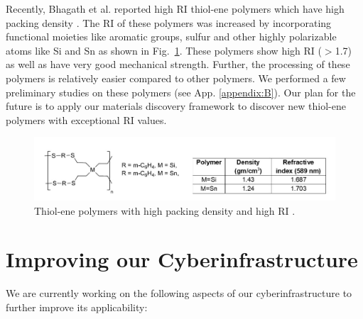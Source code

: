 Recently, Bhagath et al. reported high RI thiol-ene polymers which have high packing density \citep{Bhagat2012,Bhagat2015,Bhagat2017,Bhagat2018}. The RI of these polymers was increased by incorporating functional moieties like aromatic groups, sulfur and other highly polarizable atoms like Si and Sn as shown in Fig.\ \ref{fig:thiol-ene}. These polymers show high RI ($>$1.7) as well as have very good mechanical strength. Further, the processing of these polymers is relatively easier compared to other polymers. We performed a few preliminary studies on these polymers (see App. \ref{appendix:B}). Our plan for the future is to apply our materials discovery framework to discover new thiol-ene polymers with exceptional RI values.

\begin{figure}[htbp]
	\centering
	\includegraphics[width=1.00\textwidth]{Chapter-7/Figures/thiol-ene.jpg}
	\caption{Thiol-ene polymers with high packing density and high RI \cite{Bhagat2012}.}
	\label{fig:thiol-ene}
\end{figure}

\section{Improving our Cyberinfrastructure}
 
We are currently working on the following aspects of our cyberinfrastructure to further improve its applicability:

